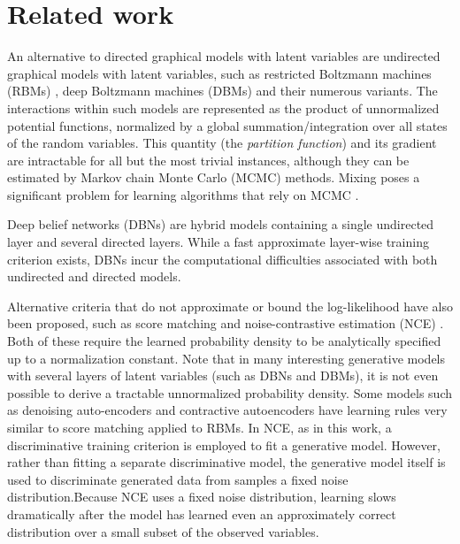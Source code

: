 \section{Related work}

An alternative to directed graphical models with latent variables are undirected graphical models with latent variables, such as restricted Boltzmann machines (RBMs) \cite{27_10.7551/mitpress/5236.003.0009,16_10.1162/neco.2006.18.7.1527}, deep Boltzmann machines (DBMs) \cite{26_salakhutdinov2009deep} and their numerous variants. The interactions within such models are represented as the product of unnormalized potential functions, normalized by a global summation/integration over all states of the random variables. This quantity (the \emph{partition function}) and its gradient are intractable for all but the most trivial instances, although they can be estimated by Markov chain Monte Carlo (MCMC) methods. Mixing poses a significant problem for learning algorithms that rely on MCMC \cite{3_pmlr-v28-bengio13,5_bengio2014deepgenerativestochasticnetworks}.

\noindent Deep belief networks (DBNs) \cite{16_10.1162/neco.2006.18.7.1527} are hybrid models containing a single undirected layer and several directed layers. While a fast approximate layer-wise training criterion exists, DBNs incur the computational difficulties associated with both undirected and directed models.

\noindent Alternative criteria that do not approximate or bound the log-likelihood have also been proposed, such as score matching \cite{18_JMLR:v6:hyvarinen05a} and noise-contrastive estimation (NCE) \cite{13_pmlr-v9-gutmann10a}. Both of these require the learned probability density to be analytically specified up to a normalization constant. Note that in many interesting generative models with several layers of latent variables (such as DBNs and DBMs), it is not even possible to derive a tractable unnormalized probability density. Some models such as denoising auto-encoders \cite{30_vincent2008extracting} and contractive autoencoders have learning rules very similar to score matching applied to RBMs. In NCE, as in this work, a discriminative training criterion is employed to ﬁt a generative model. However, rather than fitting a separate discriminative model, the generative model itself is used to discriminate generated data from samples a fixed noise distribution.Because NCE uses a fixed noise distribution, learning slows dramatically after the model has learned even an approximately correct distribution over a small subset of the observed variables.

